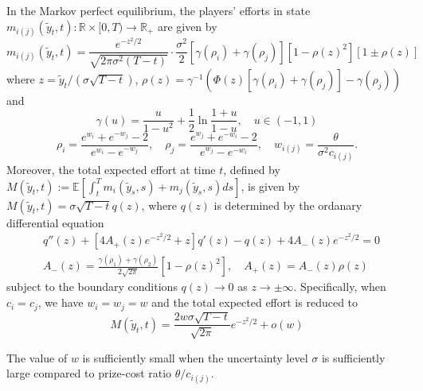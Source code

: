 \documentclass[mnsc]{informs3}
\begin{document}
\begin{theorem}
In the Markov perfect equilibrium, the players’ efforts in state $m_{i(j)}(\tilde{y}_t, t) :\mathbb{R}\times[0, T)\to\mathbb{R}_+$ are given by
\begin{equation}\label{eq-equilibrium-effort}
m_{i(j)}(\tilde{y}_t, t) = \frac{e^{-z^2/2}}{\sqrt{2\pi\sigma^2(T-t)}}\cdot \frac{\sigma^2}{2}\left[\gamma(\rho_{i}) + \gamma(\rho_{j})\right]\left[1-\rho(z)^2\right]\left[1 \pm \rho(z)\right]
\end{equation}
where $z = \tilde{y}_t / (\sigma\sqrt{T-t})$, $\rho(z) = \gamma^{-1}\left(\Phi(z)\left[\gamma(\rho_{i})+\gamma(\rho_{j})\right]-\gamma(\rho_{j})\right)$ and 
\begin{equation*}
\gamma(u) = \frac{u}{1-u^2} + \frac{1}{2}\ln\frac{1+u}{1-u},\quad u\in(-1,1)
\end{equation*}
\begin{equation*}
\rho_{i} = \frac{e^{w_{i}}+e^{-w_{j}}-2}{e^{w_{i}}-e^{-w_{j}}},
\quad
\rho_{j} = \frac{e^{w_{j}}+e^{-w_{i}}-2}{e^{w_{j}}-e^{-w_{i}}},
\quad
w_{i(j)} = \frac{\theta}{\sigma^2 c_{i(j)}}.
\end{equation*}
Moreover, the total expected effort at time $t$, defined by $M(\tilde{y}_t, t) := \mathbb{E}\left[\int^T_t m_i(\tilde{y}_s, s) + m_j(\tilde{y}_s, s)ds\right]$, is given by $M(\tilde{y}_t, t) = \sigma \sqrt{T-t} q(z)$, where $q(z)$ is determined by the ordanary differential equation 
\begin{equation}
\begin{aligned}
&q''(z) + \left[4A_+(z)e^{-z^2/2}+z\right]q'(z) - q(z) + 4A_-(z)e^{-z^2/2} = 0\\
&A_-(z) = \frac{\gamma(\rho_1) + \gamma(\rho_2)}{2\sqrt{2\pi}}[1 - \rho(z)^2],
\quad A_+(z) = A_-(z)\rho(z)
\end{aligned}
\end{equation}
subject to the boundary conditions $q(z)\to0$ as $z\to\pm\infty$. 
Specifically, when $c_i = c_j$, we have $w_i = w_j = w$ and the total expected effort is reduced to 
\begin{equation}\label{eq-totaleffort-reduced}
M(\tilde{y}_t, t) = \frac{2w\sigma\sqrt{T-t}}{\sqrt{2\pi}}e^{-z^2/2} + o(w)
\end{equation}
\end{theorem}

\begin{remark}
The value of $w$ is sufficiently small when the uncertainty level $\sigma$ is sufficiently large compared to prize-cost ratio $\theta/c_{i(j)}$. 
\end{remark}
\end{document}
